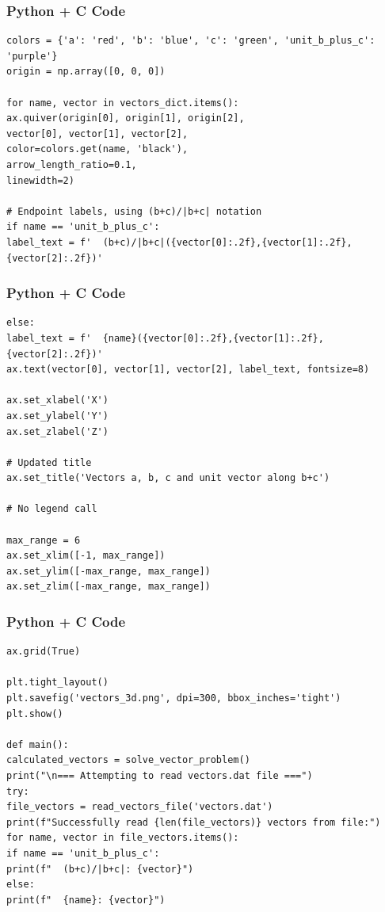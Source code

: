 \documentclass{beamer}
\begin{document}
\begin{frame}[fragile]
    \frametitle{Python + C Code}
    \begin{lstlisting}
colors = {'a': 'red', 'b': 'blue', 'c': 'green', 'unit_b_plus_c': 'purple'}
origin = np.array([0, 0, 0])

for name, vector in vectors_dict.items():
ax.quiver(origin[0], origin[1], origin[2],
vector[0], vector[1], vector[2],
color=colors.get(name, 'black'),
arrow_length_ratio=0.1,
linewidth=2)

# Endpoint labels, using (b+c)/|b+c| notation
if name == 'unit_b_plus_c':
label_text = f'  (b+c)/|b+c|({vector[0]:.2f},{vector[1]:.2f},{vector[2]:.2f})'
    \end{lstlisting}
\end{frame}

\begin{frame}[fragile]
    \frametitle{Python + C Code}
    \begin{lstlisting}
else:
label_text = f'  {name}({vector[0]:.2f},{vector[1]:.2f},{vector[2]:.2f})'
ax.text(vector[0], vector[1], vector[2], label_text, fontsize=8)

ax.set_xlabel('X')
ax.set_ylabel('Y')
ax.set_zlabel('Z')

# Updated title
ax.set_title('Vectors a, b, c and unit vector along b+c')

# No legend call

max_range = 6
ax.set_xlim([-1, max_range])
ax.set_ylim([-max_range, max_range])
ax.set_zlim([-max_range, max_range])

    \end{lstlisting}
\end{frame}

\begin{frame}[fragile]
    \frametitle{Python + C Code}
    \begin{lstlisting}
ax.grid(True)

plt.tight_layout()
plt.savefig('vectors_3d.png', dpi=300, bbox_inches='tight')
plt.show()

def main():
calculated_vectors = solve_vector_problem()
print("\n=== Attempting to read vectors.dat file ===")
try:
file_vectors = read_vectors_file('vectors.dat')
print(f"Successfully read {len(file_vectors)} vectors from file:")
for name, vector in file_vectors.items():
if name == 'unit_b_plus_c':
print(f"  (b+c)/|b+c|: {vector}")
else:
print(f"  {name}: {vector}")
    \end{lstlisting}
\end{frame}
\end{document}
